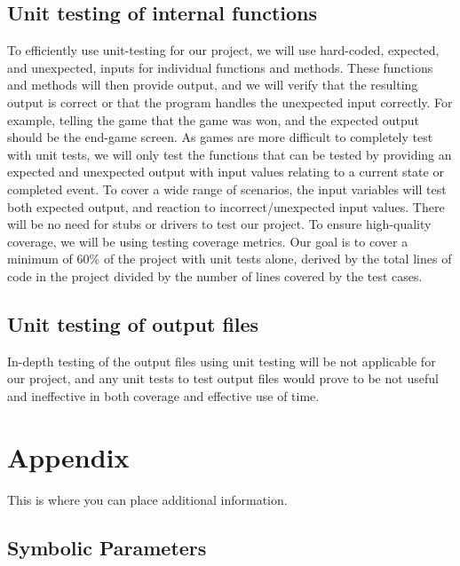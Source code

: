 \documentclass[12pt, titlepage]{article}
\begin{document}
\subsection{Unit testing of internal functions}

To efficiently use unit-testing for our project, we will use hard-coded, expected, and unexpected, inputs for individual functions and methods. These functions and methods will then provide output, and we will verify that the resulting output is correct or that the program handles the unexpected input correctly. For example, telling the game that the game was won, and the expected output should be the end-game screen. As games are more difficult to completely test with unit tests, we will only test the functions that can be tested by providing an expected and unexpected output with input values relating to a current state or completed event. To cover a wide range of scenarios, the input variables will test both expected output, and reaction to incorrect/unexpected input values. There will be no need for stubs or drivers to test our project. To ensure high-quality coverage, we will be using testing coverage metrics. Our goal is to cover a minimum of 60\% of the project with unit tests alone, derived by the total lines of code in the project divided by the number of lines covered by the test cases.
	
\subsection{Unit testing of output files}	

In-depth testing of the output files using unit testing will be not applicable for our project, and any unit tests to test output files would prove to be not useful and ineffective in both coverage and effective use of time.





\newpage

\section{Appendix}

This is where you can place additional information.

\subsection{Symbolic Parameters}
\end{document}
